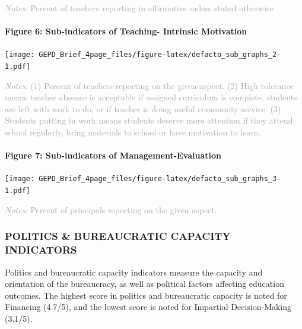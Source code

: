 \documentclass[twocolumn]{article}
\let\oldparagraph\paragraph
\renewcommand{\paragraph}[1]{\oldparagraph{#1}\mbox{}}
\begin{document}
{\scriptsize
    \textcolor{darkgray}{\textit{Notes:} Percent of teachers reporting in affirmative unless stated otherwise}
  }

\hypertarget{figure-6-sub-indicators-of-teaching--intrinsic-motivation}{%
\paragraph{Figure 6: Sub-indicators of Teaching- Intrinsic
Motivation}\label{figure-6-sub-indicators-of-teaching--intrinsic-motivation}}

\texttt{[image: GEPD\_Brief\_4page\_files/figure-latex/defacto\_sub\_graphs\_2-1.pdf]}

{\scriptsize
    \textcolor{darkgray}{\textit{Notes:} (1) Percent of teachers reporting on the given aspect. (2) High tolerance means teacher absence is acceptable if assigned curriculum is complete, students are left with work to do, or if teacher is doing useful community service. (3) Students putting in work means students deserve more attention if they attend school regularly, bring materials to school or have motivation to learn.}
  }

\hypertarget{figure-7-sub-indicators-of-management-evaluation}{%
\paragraph{Figure 7: Sub-indicators of
Management-Evaluation}\label{figure-7-sub-indicators-of-management-evaluation}}

\texttt{[image: GEPD\_Brief\_4page\_files/figure-latex/defacto\_sub\_graphs\_3-1.pdf]}

{\scriptsize
    \textcolor{darkgray}{\textit{Notes:} Percent of principals reporting on the given aspect.}
  }

\vfill\null

\hypertarget{politics-bureaucratic-capacity-indicators}{%
\subsubsection{\texorpdfstring{\textbf{POLITICS \& BUREAUCRATIC CAPACITY
INDICATORS}}{POLITICS \& BUREAUCRATIC CAPACITY INDICATORS}}\label{politics-bureaucratic-capacity-indicators}}

Politics and bureaucratic capacity indicators measure the capacity and
orientation of the bureaucracy, as well as political factors affecting
education outcomes. The highest score in politics and bureaucratic
capacity is noted for Financing (4.7/5), and the lowest score is noted
for Impartial Decision-Making (3.1/5).
\end{document}
